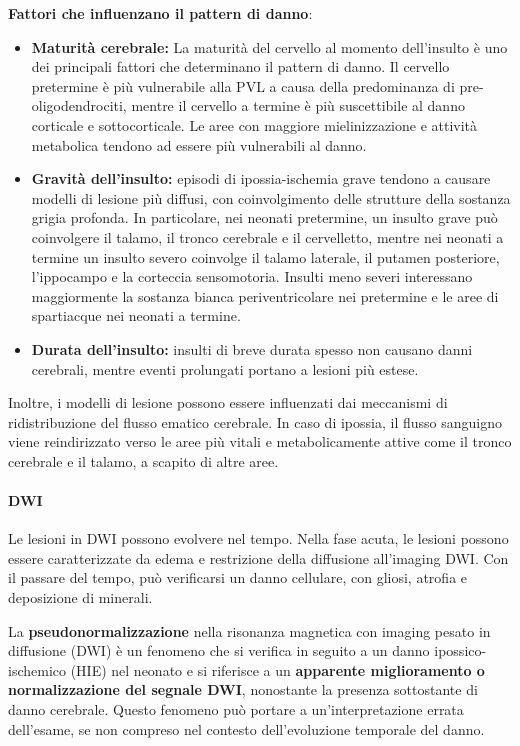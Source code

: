 \textbf{Fattori che influenzano il pattern di danno}:

\begin{itemize}
	\tightlist
	\item
	\textbf{Maturità cerebrale:} La maturità del cervello al momento dell'insulto è uno dei principali fattori che determinano il pattern di danno. Il cervello pretermine è più vulnerabile alla PVL a causa della predominanza di pre-oligodendrociti, mentre il cervello a termine è più suscettibile al danno corticale e sottocorticale. Le aree con maggiore mielinizzazione e attività metabolica tendono ad essere più vulnerabili al danno.
	\item
	\textbf{Gravità dell'insulto:} episodi di ipossia-ischemia grave tendono a causare modelli di lesione più diffusi, con coinvolgimento delle strutture della sostanza grigia profonda. In particolare, nei neonati pretermine, un insulto grave può coinvolgere il talamo, il tronco cerebrale e il cervelletto, mentre nei neonati a termine un insulto severo coinvolge il talamo laterale, il putamen posteriore, l'ippocampo e la corteccia sensomotoria. Insulti meno severi interessano maggiormente la sostanza bianca periventricolare nei pretermine e le aree di spartiacque nei neonati a termine.
	\item
	\textbf{Durata dell'insulto:} insulti di breve durata spesso non causano danni cerebrali, mentre eventi prolungati portano a lesioni più estese.
\end{itemize}

Inoltre, i modelli di lesione possono essere influenzati dai meccanismi di ridistribuzione del flusso ematico cerebrale. In caso di ipossia, il flusso sanguigno viene reindirizzato verso le aree più vitali e metabolicamente attive come il tronco cerebrale e il talamo, a scapito di altre aree.

\paragraph{DWI} Le lesioni in DWI possono evolvere nel tempo. Nella fase acuta, le lesioni possono essere caratterizzate da edema e restrizione della diffusione all'imaging DWI. Con il passare del tempo, può verificarsi un danno cellulare, con gliosi, atrofia e deposizione di minerali.

La \textbf{pseudonormalizzazione} nella risonanza magnetica con imaging pesato in diffusione (DWI) è un fenomeno che si verifica in seguito a un danno ipossico-ischemico (HIE) nel neonato e si riferisce a un \textbf{apparente miglioramento o normalizzazione del segnale DWI}, nonostante la presenza sottostante di danno cerebrale. Questo fenomeno può portare a un'interpretazione errata dell'esame, se non compreso nel contesto dell'evoluzione temporale del danno.


